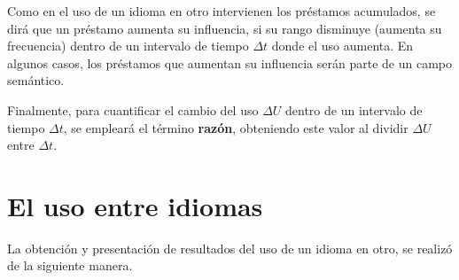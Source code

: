 Como en el uso de un idioma en otro intervienen los préstamos acumulados, se dirá que un préstamo aumenta su influencia, si su rango disminuye (aumenta su frecuencia) dentro de un intervalo de tiempo $\Delta t$ donde el uso aumenta. En algunos casos, los préstamos  que aumentan su influencia serán parte de un campo semántico.

Finalmente, para cuantificar el cambio del uso $\Delta U$ dentro de un  intervalo de tiempo $\Delta t$, se  empleará el término \textbf{razón}, obteniendo este valor al dividir $\Delta U$ entre $\Delta t$. 







\section {El uso entre idiomas}  %
La obtención y presentación de resultados del uso de un idioma en otro, se realizó de la siguiente manera.


